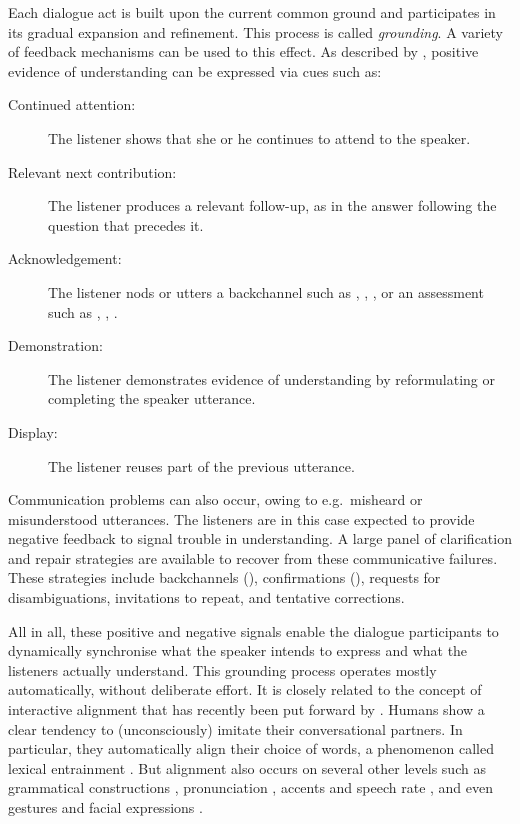 Each dialogue act is built upon the current common ground and participates in its gradual expansion and refinement.  This process is called \textit{grounding}.  A variety of feedback mechanisms  can be used to this effect.  As described by \cite{Clark1989}, positive evidence of understanding can be expressed via cues such as:
\begin{description}
\item[Continued attention: ] The listener shows that she or he continues to attend to the speaker.
\item[Relevant next contribution: ] The listener produces a relevant follow-up, as in the answer  following the question that precedes it.
\item [Acknowledgement: ] The listener nods or utters a backchannel such as , , , or an assessment such as , , .
\item [Demonstration: ] The listener demonstrates evidence of understanding by reformulating or completing the speaker utterance.
\item [Display: ] The listener reuses part of the previous utterance.
\end{description}

Communication problems can also occur, owing to e.g.\ misheard or misunderstood utterances. The listeners are in this case expected to provide negative feedback to signal trouble in understanding. A large panel of clarification and repair strategies  are available to recover from these communicative failures.  These strategies include backchannels (), confirmations  (), requests for disambiguations, invitations to repeat, and tentative corrections.  

All in all, these positive and negative signals enable the dialogue participants to dynamically synchronise what the speaker intends to express and what the listeners actually understand.   This grounding process operates mostly automatically, without deliberate effort.  It is closely related to the concept of interactive alignment that has recently been put forward by \cite{Garrod2004,Garrod2009}. Humans show a clear tendency to (unconsciously) imitate their conversational partners. In particular, they automatically align their choice of words, a phenomenon called lexical entrainment \citep{brennan1996conceptual}.  But alignment also occurs on several other levels such as grammatical constructions \citep{branigan2000syntactic}, pronunciation \citep{pardo2006phonetic}, accents and speech rate \citep{giles19911}, and even gestures and facial expressions \citep{bavelas1986show}.

